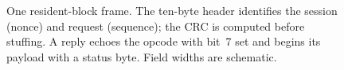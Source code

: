 \begin{figure}[t]
  \centering
  \resizebox{\columnwidth}{!}{}
  \caption{One resident-block frame. The ten-byte header identifies the
  session (nonce) and request (sequence); the CRC is computed before
  stuffing. A reply echoes the opcode with bit~7 set and begins its payload
  with a status byte. Field widths are schematic.}
  \label{fig:frame}
\end{figure}
